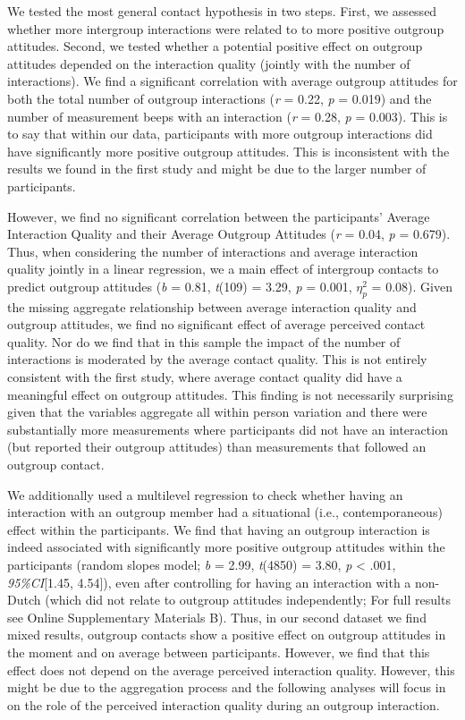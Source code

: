 We tested the most general contact hypothesis in two steps. First, we
assessed whether more intergroup interactions were related to to more
positive outgroup attitudes. Second, we tested whether a potential
positive effect on outgroup attitudes depended on the interaction
quality (jointly with the number of interactions). We find a significant
correlation with average outgroup attitudes for both the total number of
outgroup interactions (\textit{r} = 0.22, \textit{p} = 0.019) and the
number of measurement beeps with an interaction (\textit{r} = 0.28,
\textit{p} = 0.003). This is to say that within our data, participants
with more outgroup interactions did have significantly more positive
outgroup attitudes. This is inconsistent with the results we found in
the first study and might be due to the larger number of participants.

However, we find no significant correlation between the participants'
Average Interaction Quality and their Average Outgroup Attitudes
(\textit{r} = 0.04, \textit{p} = 0.679). Thus, when considering the
number of interactions and average interaction quality jointly in a
linear regression, we a main effect of intergroup contacts to predict
outgroup attitudes (\textit{b} = 0.81, \textit{t}(109) = 3.29,
\textit{p} = 0.001, \(\eta_p^2\) = 0.08). Given the missing aggregate
relationship between average interaction quality and outgroup attitudes,
we find no significant effect of average perceived contact quality. Nor
do we find that in this sample the impact of the number of interactions
is moderated by the average contact quality. This is not entirely
consistent with the first study, where average contact quality did have
a meaningful effect on outgroup attitudes. This finding is not
necessarily surprising given that the variables aggregate all within
person variation and there were substantially more measurements where
participants did not have an interaction (but reported their outgroup
attitudes) than measurements that followed an outgroup contact.

We additionally used a multilevel regression to check whether having an
interaction with an outgroup member had a situational (i.e.,
contemporaneous) effect within the participants. We find that having an
outgroup interaction is indeed associated with significantly more
positive outgroup attitudes within the participants (random slopes
model; \textit{b} = 2.99, \textit{t}(4850) = 3.80, \textit{p}
\textless{} .001, \textit{95\%CI}{[}1.45, 4.54{]}), even after
controlling for having an interaction with a non-Dutch (which did not
relate to outgroup attitudes independently; For full results see Online
Supplementary Materials B). Thus, in our second dataset we find mixed
results, outgroup contacts show a positive effect on outgroup attitudes
in the moment and on average between participants. However, we find that
this effect does not depend on the average perceived interaction
quality. However, this might be due to the aggregation process and the
following analyses will focus in on the role of the perceived
interaction quality during an outgroup interaction.

